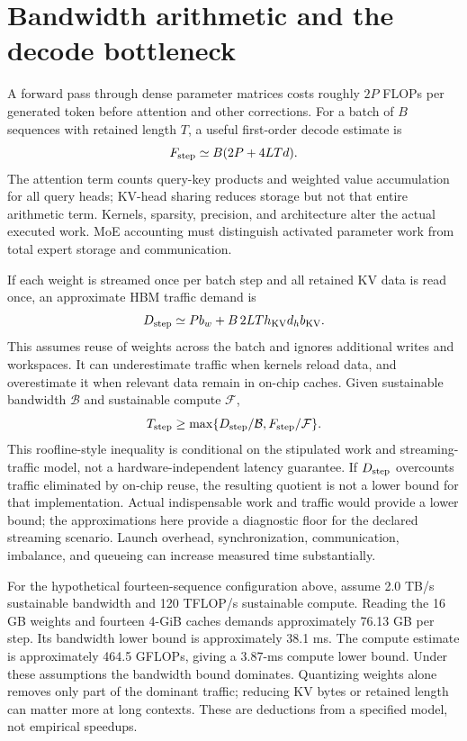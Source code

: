 \section{Bandwidth arithmetic and the decode bottleneck}\label{sec:C31:03}
A forward pass through dense parameter matrices costs roughly $2P$ FLOPs per generated token before attention and other corrections. For a batch of $B$ sequences with retained length $T$, a useful first-order decode estimate is
\begin{equation}
 F_{\rm step}\simeq B(2P+4LTd).
\end{equation}
The attention term counts query-key products and weighted value accumulation for all query heads; KV-head sharing reduces storage but not that entire arithmetic term. Kernels, sparsity, precision, and architecture alter the actual executed work. MoE accounting must distinguish activated parameter work from total expert storage and communication.

If each weight is streamed once per batch step and all retained KV data is read once, an approximate HBM traffic demand is
\begin{equation}
 D_{\rm step}\simeq Pb_w+B\,2LTh_{\rm KV}d_hb_{\rm KV}.
\end{equation}
This assumes reuse of weights across the batch and ignores additional writes and workspaces. It can underestimate traffic when kernels reload data, and overestimate it when relevant data remain in on-chip caches. Given sustainable bandwidth $\mathcal B$ and sustainable compute $\mathcal F$,
\begin{equation}
 T_{\rm step}\geq\max\{D_{\rm step}/\mathcal B,
 F_{\rm step}/\mathcal F\}.
\end{equation}
This roofline-style inequality is conditional on the stipulated work and streaming-traffic model, not a hardware-independent latency guarantee. If $D_{\rm step}$ overcounts traffic eliminated by on-chip reuse, the resulting quotient is not a lower bound for that implementation. Actual indispensable work and traffic would provide a lower bound; the approximations here provide a diagnostic floor for the declared streaming scenario. Launch overhead, synchronization, communication, imbalance, and queueing can increase measured time substantially.

For the hypothetical fourteen-sequence configuration above, assume 2.0 TB/s sustainable bandwidth and 120 TFLOP/s sustainable compute. Reading the 16 GB weights and fourteen 4-GiB caches demands approximately 76.13 GB per step. Its bandwidth lower bound is approximately 38.1 ms. The compute estimate is approximately 464.5 GFLOPs, giving a 3.87-ms compute lower bound. Under these assumptions the bandwidth bound dominates. Quantizing weights alone removes only part of the dominant traffic; reducing KV bytes or retained length can matter more at long contexts. These are deductions from a specified model, not empirical speedups.

